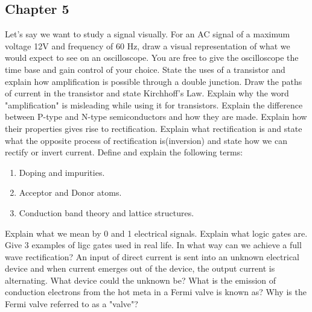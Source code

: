 \documentclass[12pt,addpoints]{exam}
\begin{document}
\begin{questions}
		\subsection*{Chapter 5}
		\question Let's say we want to study a signal visually. For an AC signal of a maximum voltage 12V and frequency of 60 Hz, draw a visual representation of what we would expect to see on an oscilloscope. You are free to give the oscilloscope the time base and gain control of your choice.\vspace{1.5in}
		\question State the uses of a transistor and explain how amplification is possible through a double junction. Draw the paths of current in the transistor and state Kirchhoff's Law. Explain why the word "amplification" is misleading while using it for transistors.\vspace{1.5in}
		\question Explain the difference between P-type and N-type semiconductors and how they are made. Explain how their properties gives rise to rectification. Explain what rectification is and state what the opposite process of rectification is(inversion) and state how we can rectify or invert current.\vspace{1.5in}
		\question Define and explain the following terms:
		\begin{enumerate}[label=(\roman*)]
			\item  Doping and impurities.\vspace{1.5in}
			\item  Acceptor and Donor atoms.\vspace{1.5in}
			\item  Conduction band theory and lattice structures.\vspace{1.5in}
		\end{enumerate}
		\question Explain what we mean by 0 and 1 electrical signals. Explain what logic gates are. Give 3 examples of ligc gates used in real life.\vspace{1.5in}
		\question In what way can we achieve a full wave rectification?\vspace{1.5in}
		\question An input of direct current is sent into an unknown electrical device and when current emerges out of the device, the output current is alternating. What device could the unknown be?\vspace{1.5in}
		\question What is the emission of conduction electrons from the hot meta in a Fermi valve is known as?\vspace{1.5in}
		\question Why is the Fermi valve referred to as a "valve"?\vspace{1.5in}

\end{questions}
\end{document}
